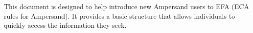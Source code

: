 This document is designed to help introduce new Ampersand users to EFA 
(ECA rules for Ampersand). It provides a basic structure that allows 
individuals to quickly access the information they seek. 
 

%